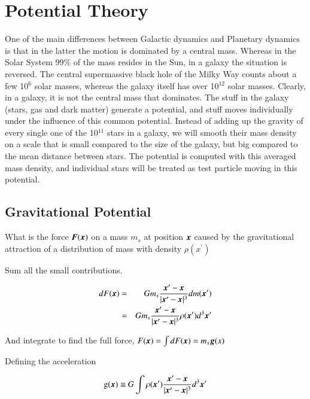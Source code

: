 
\section{Potential Theory}

One of the main differences between Galactic dynamics and Planetary dynamics is that in the latter the motion is dominated by a central mass. Whereas in the Solar System 99\% of the mass resides in the Sun, in a galaxy the situation is reversed. The central supermassive black hole of the Milky Way counts about a few 10$^6$ solar masses, whereas the galaxy itself has over 10$^{12}$ solar masses. Clearly, in a galaxy, it is not the central mass that dominates. The stuff in the galaxy (stars, gas and dark matter) generate a potential, and stuff moves individually under the influence of this common potential. Instead of adding up the gravity of every single one of the 10$^{11}$ stars in a galaxy, we will smooth their mass density on a scale that is small compared to the size of the galaxy, but big compared to the mean distance between stars. The potential is computed with this averaged mass density, and individual stars will be treated as test particle moving in this potential.

\subsection{Gravitational Potential}

What is the force ${\boldsymbol{F}}({\boldsymbol{x}})$ on a mass $m_s$ at position ${\boldsymbol{x}}$ caused by the gravitational attraction of a distribution of mass with density $\rho(x^\prime) $

Sum all the small contributions.

\begin{eqnarray}
d F({\boldsymbol{x}}) &=& G m_s \frac{{\boldsymbol{x}}^\prime - {\boldsymbol{x}}}{|{\boldsymbol{x}}^\prime-{\boldsymbol{x}}|^3} d m({\boldsymbol{x}}^\prime)\\
&=& G m_s \frac{{\boldsymbol{x}}^\prime - {\boldsymbol{x}}}{|{\boldsymbol{x}}^\prime-{\boldsymbol{x}}|^3} \rho({\boldsymbol{x}}^\prime) d^3{\boldsymbol{x}}^\prime
\end{eqnarray}

And integrate to find the full force, $F ({\boldsymbol{x}})= \int dF({\boldsymbol{x}}) = m_s {\boldsymbol{g}}(x) $

Defining the acceleration

\begin{equation}
\mathrm{g}({\boldsymbol{x}}) \equiv  G \int \rho({\boldsymbol{x}}^\prime) \frac{{\boldsymbol{x}}^\prime - {\boldsymbol{x}}}{|{\boldsymbol{x}}^\prime-{\boldsymbol{x}}|^3}  d^3{\boldsymbol{x}}^\prime
\end{equation}


